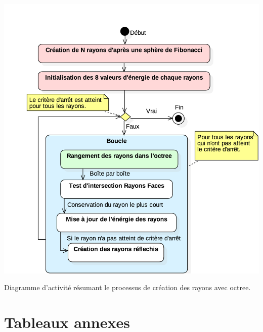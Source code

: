 \begin{figureth}
	\includegraphics[width=0.9\linewidth]{images/DiagRay2}
	\caption{Diagramme d'activité résumant le processus de création des rayons avec \gls{octree}.}
	\label{DiagRay2}
\end{figureth}

\section*{Tableaux annexes}

